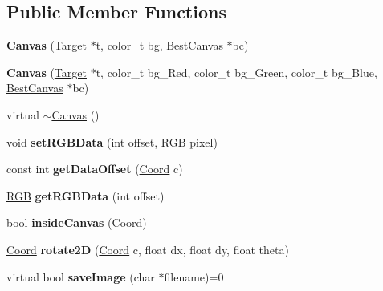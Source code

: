 \subsection*{Public Member Functions}
\begin{DoxyCompactItemize}
\item 
\hypertarget{classCanvas_a53b246273af5f8312e98963ebc5f18c8}{}\label{classCanvas_a53b246273af5f8312e98963ebc5f18c8} 
{\bfseries Canvas} (\hyperlink{classTarget}{Target} $\ast$t, color\+\_\+t bg, \hyperlink{classBestCanvas}{Best\+Canvas} $\ast$bc)
\item 
\hypertarget{classCanvas_ae3d42b2fc30548f6c6bf7d269067e9c7}{}\label{classCanvas_ae3d42b2fc30548f6c6bf7d269067e9c7} 
{\bfseries Canvas} (\hyperlink{classTarget}{Target} $\ast$t, color\+\_\+t bg\+\_\+\+Red, color\+\_\+t bg\+\_\+\+Green, color\+\_\+t bg\+\_\+\+Blue, \hyperlink{classBestCanvas}{Best\+Canvas} $\ast$bc)
\item 
virtual \hyperlink{classCanvas_a237c4549ad2e27c729cd1f71e89f0fd9}{$\sim$\+Canvas} ()
\item 
\hypertarget{classCanvas_aa6fd94baa21ffded183b4bf2375d9516}{}\label{classCanvas_aa6fd94baa21ffded183b4bf2375d9516} 
void {\bfseries set\+R\+G\+B\+Data} (int offset, \hyperlink{structRGB}{R\+GB} pixel)
\item 
\hypertarget{classCanvas_a9b47997839f63bda394c7385eac6f96e}{}\label{classCanvas_a9b47997839f63bda394c7385eac6f96e} 
const int {\bfseries get\+Data\+Offset} (\hyperlink{structCoord}{Coord} c)
\item 
\hypertarget{classCanvas_ab1686ad837e67a4c93d7539d0d3d0151}{}\label{classCanvas_ab1686ad837e67a4c93d7539d0d3d0151} 
\hyperlink{structRGB}{R\+GB} {\bfseries get\+R\+G\+B\+Data} (int offset)
\item 
\hypertarget{classCanvas_a9e51f90be565cb3e5d683cdf83d67956}{}\label{classCanvas_a9e51f90be565cb3e5d683cdf83d67956} 
bool {\bfseries inside\+Canvas} (\hyperlink{structCoord}{Coord})
\item 
\hypertarget{classCanvas_ae397083afa0345eec9c0e212903a6394}{}\label{classCanvas_ae397083afa0345eec9c0e212903a6394} 
\hyperlink{structCoord}{Coord} {\bfseries rotate2D} (\hyperlink{structCoord}{Coord} c, float dx, float dy, float theta)
\item 
\hypertarget{classCanvas_abbde1d2cfe76cb174828233e610b62ac}{}\label{classCanvas_abbde1d2cfe76cb174828233e610b62ac} 
virtual bool {\bfseries save\+Image} (char $\ast$filename)=0
\item 
\hypertarget{classCanvas_a20a5bfc766b35f031f87602a33d004b1}{}\label{classCanvas_a20a5bfc766b35f031f87602a33d004b1} 

\end{DoxyCompactItemize}
